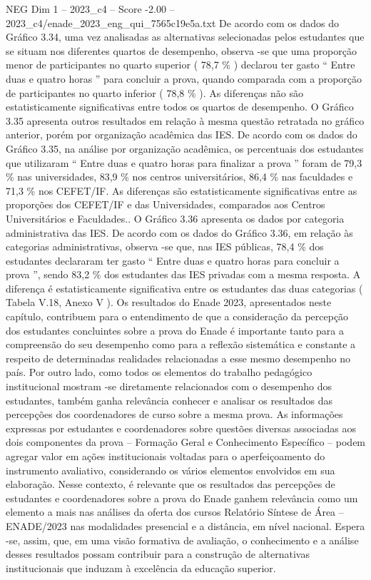 \begin{textsample}{NEG Dim 1 – 2023\_c4 – Score -2.00 – 2023\_c4/enade\_2023\_eng\_qui\_7565c19e5a.txt}
De acordo com os dados do Gráfico 3.34, uma vez analisadas as alternativas selecionadas pelos estudantes que se situam nos diferentes quartos de desempenho, observa -se que uma proporção menor de participantes no quarto superior ( 78,7 \% ) declarou ter gasto “ Entre duas e quatro horas ” para concluir a prova, quando comparada com a proporção de participantes no quarto inferior ( 78,8 \% ).
As diferenças não são estatisticamente significativas entre todos os quartos de desempenho.
O Gráfico 3.35 apresenta outros resultados em relação à mesma questão retratada no gráfico anterior, porém por organização acadêmica das IES.
De acordo com os dados do Gráfico 3.35, na análise por organização acadêmica, os percentuais dos estudantes que utilizaram “ Entre duas e quatro horas para finalizar a prova ” foram de 79,3 \% nas universidades, 83,9 \% nos centros universitários, 86,4 \% nas faculdades e 71,3 \% nos CEFET/IF.
As diferenças são estatisticamente significativas entre as proporções dos CEFET/IF e das Universidades, comparados aos Centros Universitários e Faculdades..
O Gráfico 3.36 apresenta os dados por categoria administrativa das IES.
De acordo com os dados do Gráfico 3.36, em relação às categorias administrativas, observa -se que, nas IES públicas, 78,4 \% dos estudantes declararam ter gasto “ Entre duas e quatro horas para concluir a prova ”, sendo 83,2 \% dos estudantes das IES privadas com a mesma resposta.
A diferença é estatisticamente significativa entre os estudantes das duas categorias ( Tabela V.18, Anexo V ).
Os resultados do Enade 2023, apresentados neste capítulo, contribuem para o entendimento de que a consideração da percepção dos estudantes concluintes sobre a prova do Enade é importante tanto para a compreensão do seu desempenho como para a reflexão sistemática e constante a respeito de determinadas realidades relacionadas a esse mesmo desempenho no país.
Por outro lado, como todos os elementos do trabalho pedagógico institucional mostram -se diretamente relacionados com o desempenho dos estudantes, também ganha relevância conhecer e analisar os resultados das percepções dos coordenadores de curso sobre a mesma prova.
As informações expressas por estudantes e coordenadores sobre questões diversas associadas aos dois componentes da prova – Formação Geral e Conhecimento Específico – podem agregar valor em ações institucionais voltadas para o aperfeiçoamento do instrumento avaliativo, considerando os vários elementos envolvidos em sua elaboração.
Nesse contexto, é relevante que os resultados das percepções de estudantes e coordenadores sobre a prova do Enade ganhem relevância como um elemento a mais nas análises da oferta dos cursos Relatório Síntese de Área – ENADE/2023 nas modalidades presencial e a distância, em nível nacional.
Espera -se, assim, que, em uma visão formativa de avaliação, o conhecimento e a análise desses resultados possam contribuir para a construção de alternativas institucionais que induzam à excelência da educação superior.

\end{textsample}
